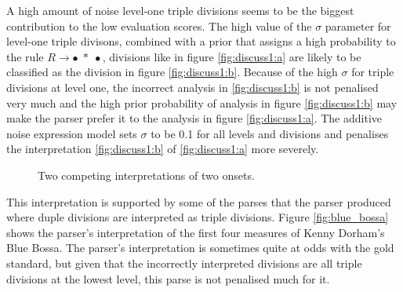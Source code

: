 
A high amount of noise level-one triple divisions seems to be the biggest contribution to the low evaluation scores. The high value of the $\sigma$ parameter for level-one triple divisons, combined with a prior that assigns a high probability to the rule $R \rightarrow \bullet\; *\; \bullet$, divisions like in figure \ref{fig:discuss1:a} are likely to be classified as the division in figure \ref{fig:discuss1:b}. Because of the high $\sigma$ for triple divisions at level one, the incorrect analysis in \ref{fig:discuss1:b} is not penalised very much and the high prior probability of analysis in figure \ref{fig:discuss1:b} may make the parser prefer it to the analysis in figure \ref{fig:discuss1:a}. The additive noise expression model sets $\sigma$ to be 0.1 for all levels and divisions and penalises the interpretation \ref{fig:discuss1:b} of \ref{fig:discuss1:a} more severely.

\begin{figure}
\centering
{}
\caption{Two competing interpretations of two onsets.}
\label{fig:discuss1}
\end{figure}

This interpretation is supported by some of the parses that the parser produced where duple divisions are interpreted as triple divisions. Figure \ref{fig:blue_bossa} shows the parser's interpretation of the first four measures of Kenny Dorham's Blue Bossa. The parser's interpretation is sometimes quite at odds with the gold standard, but given that the incorrectly interpreted divisions are all triple divisions at the lowest level, this parse is not penalised much for it.

